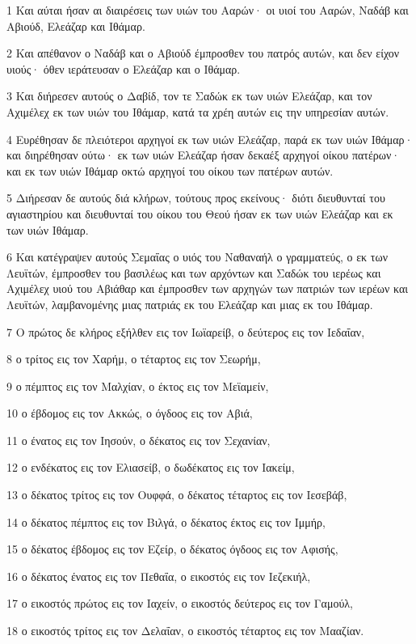 \par 1 Και αύται ήσαν αι διαιρέσεις των υιών του Ααρών· οι υιοί του Ααρών, Ναδάβ και Αβιούδ, Ελεάζαρ και Ιθάμαρ.
\par 2 Και απέθανον ο Ναδάβ και ο Αβιούδ έμπροσθεν του πατρός αυτών, και δεν είχον υιούς· όθεν ιεράτευσαν ο Ελεάζαρ και ο Ιθάμαρ.
\par 3 Και διήρεσεν αυτούς ο Δαβίδ, τον τε Σαδώκ εκ των υιών Ελεάζαρ, και τον Αχιμέλεχ εκ των υιών του Ιθάμαρ, κατά τα χρέη αυτών εις την υπηρεσίαν αυτών.
\par 4 Ευρέθησαν δε πλειότεροι αρχηγοί εκ των υιών Ελεάζαρ, παρά εκ των υιών Ιθάμαρ· και διηρέθησαν ούτω· εκ των υιών Ελεάζαρ ήσαν δεκαέξ αρχηγοί οίκου πατέρων· και εκ των υιών Ιθάμαρ οκτώ αρχηγοί του οίκου των πατέρων αυτών.
\par 5 Διήρεσαν δε αυτούς διά κλήρων, τούτους προς εκείνους· διότι διευθυνταί του αγιαστηρίου και διευθυνταί του οίκου του Θεού ήσαν εκ των υιών Ελεάζαρ και εκ των υιών Ιθάμαρ.
\par 6 Και κατέγραψεν αυτούς Σεμαΐας ο υιός του Ναθαναήλ ο γραμματεύς, ο εκ των Λευϊτών, έμπροσθεν του βασιλέως και των αρχόντων και Σαδώκ του ιερέως και Αχιμέλεχ υιού του Αβιάθαρ και έμπροσθεν των αρχηγών των πατριών των ιερέων και Λευϊτών, λαμβανομένης μιας πατριάς εκ του Ελεάζαρ και μιας εκ του Ιθάμαρ.
\par 7 Ο πρώτος δε κλήρος εξήλθεν εις τον Ιωϊαρείβ, ο δεύτερος εις τον Ιεδαΐαν,
\par 8 ο τρίτος εις τον Χαρήμ, ο τέταρτος εις τον Σεωρήμ,
\par 9 ο πέμπτος εις τον Μαλχίαν, ο έκτος εις τον Μεϊαμείν,
\par 10 ο έβδομος εις τον Ακκώς, ο όγδοος εις τον Αβιά,
\par 11 ο ένατος εις τον Ιησούν, ο δέκατος εις τον Σεχανίαν,
\par 12 ο ενδέκατος εις τον Ελιασείβ, ο δωδέκατος εις τον Ιακείμ,
\par 13 ο δέκατος τρίτος εις τον Ουφφά, ο δέκατος τέταρτος εις τον Ιεσεβάβ,
\par 14 ο δέκατος πέμπτος εις τον Βιλγά, ο δέκατος έκτος εις τον Ιμμήρ,
\par 15 ο δέκατος έβδομος εις τον Εζείρ, ο δέκατος όγδοος εις τον Αφισής,
\par 16 ο δέκατος ένατος εις τον Πεθαΐα, ο εικοστός εις τον Ιεζεκιήλ,
\par 17 ο εικοστός πρώτος εις τον Ιαχείν, ο εικοστός δεύτερος εις τον Γαμούλ,
\par 18 ο εικοστός τρίτος εις τον Δελαΐαν, ο εικοστός τέταρτος εις τον Μααζίαν.
